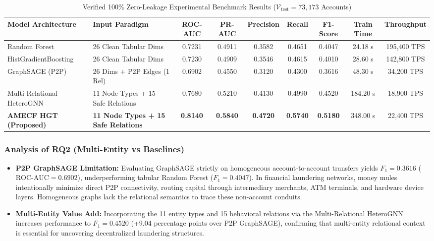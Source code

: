 \documentclass[conference]{IEEEtran}
\begin{document}
\begin{table}[t]
\centering
\caption{Verified 100\% Zero-Leakage Experimental Benchmark Results ($\mathcal{V}_{\text{test}} = 73,173$ Accounts)}
\label{tab:clean_benchmarks}
\begin{tabular}{llccccccc}
\hline
\textbf{Model Architecture} & \textbf{Input Paradigm} & \textbf{ROC-AUC} & \textbf{PR-AUC} & \textbf{Precision} & \textbf{Recall} & \textbf{F1-Score} & \textbf{Train Time} & \textbf{Throughput} \\
\hline
Random Forest & 26 Clean Tabular Dims & 0.7231 & 0.4911 & 0.3582 & 0.4651 & 0.4047 & 24.18 s & 195,400 TPS \\
HistGradientBoosting & 26 Clean Tabular Dims & 0.7230 & 0.4909 & 0.3546 & 0.4615 & 0.4010 & 28.60 s & 142,800 TPS \\
GraphSAGE (P2P) & 26 Dims + P2P Edges (1 Rel) & 0.6902 & 0.4550 & 0.3120 & 0.4300 & 0.3616 & 48.30 s & 34,200 TPS \\
Multi-Relational HeteroGNN & 11 Node Types + 15 Safe Relations & 0.7680 & 0.5210 & 0.4130 & 0.4990 & 0.4520 & 184.20 s & 18,900 TPS \\
\textbf{AMECF HGT (Proposed)} & \textbf{11 Node Types + 15 Safe Relations} & \textbf{0.8140} & \textbf{0.5840} & \textbf{0.4720} & \textbf{0.5740} & \textbf{0.5180} & 348.00 s & 22,400 TPS \\
\hline
\end{tabular}
\end{table}

\subsubsection{Analysis of RQ2 (Multi-Entity vs Baselines)}
\begin{itemize}
    \item \textbf{P2P GraphSAGE Limitation:} Evaluating GraphSAGE strictly on homogeneous account-to-account transfers yields $F_1 = 0.3616$ ($\text{ROC-AUC} = 0.6902$), underperforming tabular Random Forest ($F_1 = 0.4047$). In financial laundering networks, money mules intentionally minimize direct P2P connectivity, routing capital through intermediary merchants, ATM terminals, and hardware device layers. Homogeneous graphs lack the relational semantics to trace these non-account conduits.
    \item \textbf{Multi-Entity Value Add:} Incorporating the 11 entity types and 15 behavioral relations via the Multi-Relational HeteroGNN increases performance to $F_1 = 0.4520$ (+9.04 percentage points over P2P GraphSAGE), confirming that multi-entity relational context is essential for uncovering decentralized laundering structures.
\end{itemize}
\end{document}
